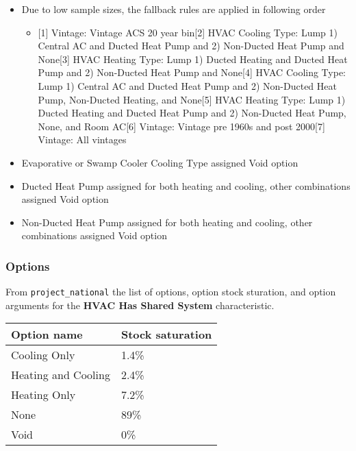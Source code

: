 \begin{itemize}
 
\item
  Due to low sample sizes, the fallback rules are applied in following
  order

  \begin{itemize}
   
  \item
    {[}1{]} Vintage: Vintage ACS 20 year bin{[}2{]} HVAC Cooling Type:
    Lump 1) Central AC and Ducted Heat Pump and 2) Non-Ducted Heat Pump
    and None{[}3{]} HVAC Heating Type: Lump 1) Ducted Heating and Ducted
    Heat Pump and 2) Non-Ducted Heat Pump and None{[}4{]} HVAC Cooling
    Type: Lump 1) Central AC and Ducted Heat Pump and 2) Non-Ducted Heat
    Pump, Non-Ducted Heating, and None{[}5{]} HVAC Heating Type: Lump 1)
    Ducted Heating and Ducted Heat Pump and 2) Non-Ducted Heat Pump,
    None, and Room AC{[}6{]} Vintage: Vintage pre 1960s and post
    2000{[}7{]} Vintage: All vintages
  \end{itemize}
\item
  Evaporative or Swamp Cooler Cooling Type assigned Void option
\item
  Ducted Heat Pump assigned for both heating and cooling, other
  combinations assigned Void option
\item
  Non-Ducted Heat Pump assigned for both heating and cooling, other
  combinations assigned Void option
\end{itemize}

\subsubsection{Options}\label{options-68}

From \texttt{project\_national} the list of options, option stock
sturation, and option arguments for the \textbf{HVAC Has Shared System}
characteristic.

\begin{longtable}[]{@{}ll@{}}
\toprule\noalign{}
Option name & Stock saturation \\
\midrule\noalign{}
\endhead
\bottomrule\noalign{}
\endlastfoot
Cooling Only & 1.4\% \\
Heating and Cooling & 2.4\% \\
Heating Only & 7.2\% \\
None & 89\% \\
Void & 0\% \\
\end{longtable}

